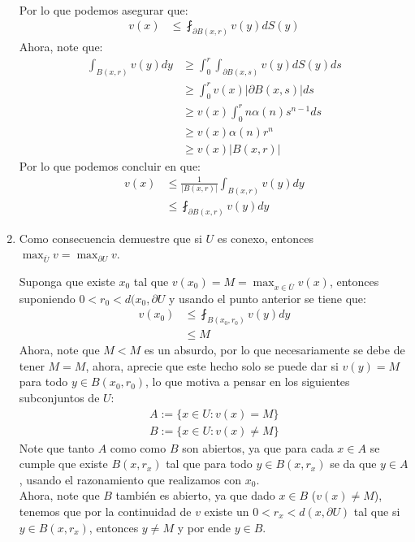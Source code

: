 \begin{homeworkProblem}
\begin{enumerate}
\begin{solucion}
\begin{align*}
        \end{align*}
        Por lo que podemos asegurar que:
        \begin{align*}
          v(x)&\leq \fint_{\partial B(x,r)}v(y)dS(y)
        \end{align*}
        Ahora, note que:
        \begin{align*}
          \int_{B(x,r)}v(y)dy&\geq \int_{0}^{r}\int_{\partial B(x,s)}v(y)dS(y)ds\\
          &\geq \int_{0}^{r}v(x)|\partial B(x,s)|ds\\
          &\geq v(x)\int_{0}^{r}n\alpha(n)s^{n-1}ds\\
          &\geq v(x)\alpha(n)r^{n}\\
          &\geq v(x)|B(x,r)|
        \end{align*}
        Por lo que podemos concluir en que:
        \begin{align*}
          v(x)&\leq \frac{1}{|B(x,r)|}\int_{B(x,r)}v(y)dy\\
          &\leq \fint_{\partial B(x,r)}v(y)dy
        \end{align*}
        \demostrado
      \end{solucion}
    \item Como consecuencia demuestre que si $U$ es conexo, entonces $\max_{\overline{U}}v=\max_{\partial U}v$.
      \begin{solucion} 
        Suponga que existe $x_0$ tal que $v(x_0)=M=\max_{x\in \overline{U}}v(x)$, entonces suponiendo $0<r_0<d(x_0,\partial U$ y usando el punto anterior se tiene que:
        \begin{align*}
          v(x_0)&\leq\fint_{B(x_0,r_0)}v(y)dy\\
          &\leq M
        \end{align*}
        Ahora, note que $M<M$ es un absurdo, por lo que necesariamente se debe de tener $M=M$, ahora, aprecie que este hecho solo se puede dar si $v(y)=M$ para todo $y\in B(x_0,r_0)$, lo que motiva a pensar en los siguientes subconjuntos de $U$:
        \begin{align*}
          A:=\{x\in U: v(x)=M\}\\
          B:=\{x\in U: v(x)\neq M\}
        \end{align*}
        Note que tanto $A$ como como $B$ son abiertos, ya que para cada $x\in A$ se cumple que existe $B(x,r_x)$ tal que para todo $y\in B(x,r_x)$ se da que $y\in A$, usando el razonamiento que realizamos con $x_0$.\\
        Ahora, note que $B$ también es abierto, ya que dado $x\in B$ ($v(x)\neq M$), tenemos que por la continuidad de $v$ existe un $0<r_x<d(x,\partial U)$ tal que si $y\in B(x,r_x)$, entonces $y\neq M$ y por ende $y\in B$.\\

\end{solucion}
\end{enumerate}
\end{homeworkProblem}
